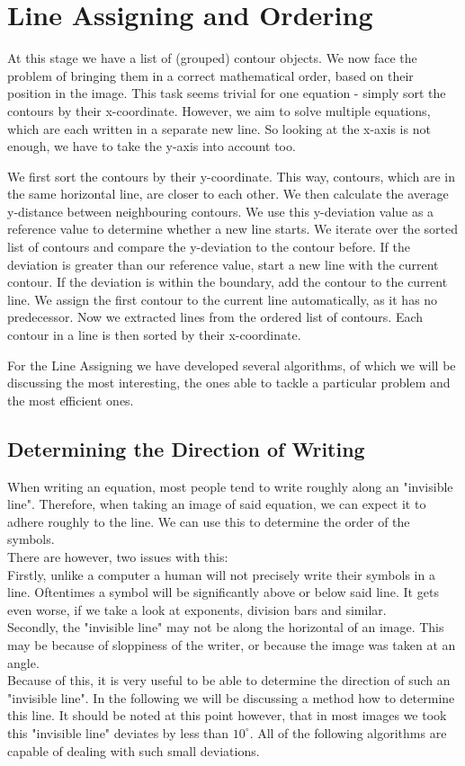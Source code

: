 \documentclass[12pt]{article}
\begin{document}
\section{Line Assigning and Ordering}
	At this stage we have a list of (grouped) contour objects. We now face the problem of bringing them in a correct mathematical order, based on their position in the image.
	This task seems trivial for one equation - simply sort the contours by their x-coordinate.
	However, we aim to solve multiple equations, which are each written in a separate new line.
	So looking at the x-axis is not enough, we have to take the y-axis into account too.

	We first sort the contours by their y-coordinate. This way, contours, which are in the same horizontal line, are closer to each other.
	We then calculate the average y-distance between neighbouring contours. We use this y-deviation value as a reference value to determine whether a new line starts.
	We iterate over the sorted list of contours and compare the y-deviation to the contour before. If the deviation is greater than our reference value,
	start a new line with the current contour. If the deviation is within the boundary, add the contour to the current line.
	We assign the first contour to the current line automatically, as it has no predecessor.
	Now we extracted lines from the ordered list of contours. Each contour in a line is then sorted by their x-coordinate.

	For the Line Assigning we have developed several algorithms, of which we will be discussing the most interesting, the ones able to tackle a particular problem and the most efficient ones.

	\subsection{Determining the Direction of Writing}
	When writing an equation, most people tend to write roughly along an "invisible line".
	Therefore, when taking an image of said equation, we can expect it to adhere roughly to the line.
	We can use this to determine the order of the symbols.\\
	There are however, two issues with this:\\
	Firstly, unlike a computer a human will not precisely write their symbols in a line.
	Oftentimes a symbol will be significantly above or below said line.
	It gets even worse, if we take a look at exponents, division bars and similar.\\
	Secondly, the "invisible line" may not be along the horizontal of an image.
	This may be because of sloppiness of the writer, or because the image was taken at an angle.\\
	Because of this, it is very useful to be able to determine the direction of such an "invisible line".
	In the following we will be discussing a method how to determine this line.
	It should be noted at this point however, that in most images we took this "invisible line" deviates by less than $10^\circ$.
	All of the following algorithms are capable of dealing with such small deviations.\\
	
\end{document}
